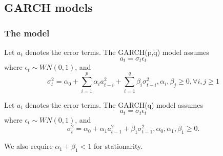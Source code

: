 \subsection{GARCH models}
\subsubsection{The model}
\begin{definition}\cite[132]{tsay2005analysis}
	Let $a_t$ denotes the error terms. The GARCH(p,q) model assumes
	$$a_t = \sigma_t \epsilon_t$$
	where $\epsilon_t\sim WN(0,1)$, 
	and $$\sigma_t^2 = \alpha_0 + \sum_{i=1}^p \alpha_i a_{t-i}^2 + \sum_{i=1}^q \beta_i \sigma_{t-i}^2, \alpha_i, \beta_j \geq 0,\forall i,j \geq 1$$
\end{definition}


\begin{definition}
	Let $a_t$ denotes the error terms. The GARCH(q) model assumes
	$$a_t = \sigma_t \epsilon_t$$
	where $\epsilon_t\sim WN(0,1)$, 
	and $$\sigma_t^2 = \alpha_0 + \alpha_1 a_{t-1}^2+ \beta_1 \sigma_{t-1}^2, \alpha_0,\alpha_1,\beta_1 \geq 0.$$
	
	We also require $\alpha_1 + \beta_1<1$ for stationarity.
\end{definition}


